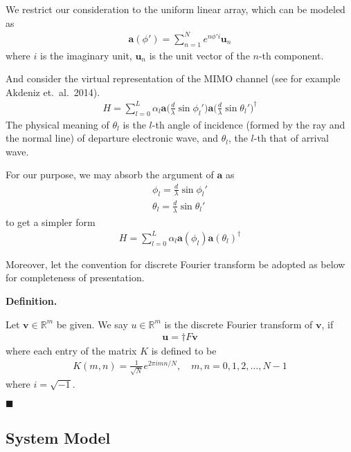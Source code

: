 \documentclass[12pt]{article}
\newcounter{NumResult}
\newcommand{\myCount}
{
   \stepcounter{NumResult}
   \textbf{\arabic{NumResult}}
}
\newcommand {\Result} [2]
{
   \bigskip
   \myCount \textbf{#1} \par
   {#2} \par
   \hfill \(\blacksquare\)
   \bigskip
}
\begin{document}
We restrict our consideration to the uniform linear array, which can be modeled as
\begin{gather}
\mathbf{a}(\phi')
=\sum_{n=1}^{N} e^{n \phi' i} \mathbf{u}_n
\end{gather}
where \(i\) is the imaginary unit, \(\mathbf{u}_n\) is the unit vector of the \(n\)-th component.

And consider the virtual representation of the MIMO channel (see for example Akdeniz et.\ al.\ 2014).
\begin{gather}
H
=\sum_{l=0}^L \alpha_l \mathbf{a}\big( \frac{d}{\lambda} \sin \phi_l' \big) \mathbf{a}\big( \frac{d}{\lambda} \sin \theta_l' \big)^\dagger
\end{gather}
The physical meaning of \(\theta_l\) is the \(l\)-th angle of incidence (formed by the ray and the normal line) of departure electronic wave, and \(\theta_l\), the \(l\)-th that of arrival wave.

For our purpose, we may absorb the argument of \(\mathbf{a}\) as
\begin{gather}
\phi_l
=\frac{d}{\lambda} \sin \phi_l' \\
\theta_l
=\frac{d}{\lambda} \sin \theta_l'
\end{gather}
to get a simpler form
\begin{gather}
H
=\sum_{l=0}^L \alpha_l \mathbf{a}(\phi_l) \mathbf{a}(\theta_l)^\dagger
\end{gather}

Moreover, let the convention for discrete Fourier transform be adopted as below for completeness of presentation.

\Result
{Definition.}
{
Let \(\mathbf{v} \in \mathbb{R}^m\) be given.
We say \(u \in \mathbb{R}^m\) is the discrete Fourier transform of \(\mathbf{v}\), if
\begin{gather}
\mathbf{u} =\dagger F \mathbf{v}
\end{gather}
where each entry of the matrix \(K\) is defined to be
\begin{gather}
   K(m,n) =\frac{1}{\sqrt{N}} e^{2\pi imn/N},
\quad m,n =0,1,2,\dotsc, N-1
\end{gather}
where \(i =\sqrt{-1}\).
}

\subsection{System Model}
\end{document}
